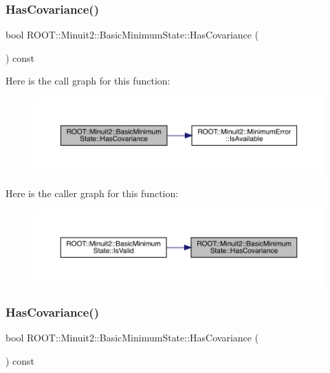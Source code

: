 \subsubsection{\texorpdfstring{HasCovariance()}{HasCovariance()}\hspace{0.1cm}{\footnotesize\ttfamily [2/3]}}
{\footnotesize\ttfamily bool R\+O\+O\+T\+::\+Minuit2\+::\+Basic\+Minimum\+State\+::\+Has\+Covariance (\begin{DoxyParamCaption}{ }\end{DoxyParamCaption}) const\hspace{0.3cm}{\ttfamily [inline]}}

Here is the call graph for this function\+:
\nopagebreak
\begin{figure}[H]
\begin{center}
\leavevmode
\includegraphics[width=350pt]{d0/db1/classROOT_1_1Minuit2_1_1BasicMinimumState_a9d43155058c576759d062561d77b3e1d_cgraph}
\end{center}
\end{figure}
Here is the caller graph for this function\+:
\nopagebreak
\begin{figure}[H]
\begin{center}
\leavevmode
\includegraphics[width=350pt]{d0/db1/classROOT_1_1Minuit2_1_1BasicMinimumState_a9d43155058c576759d062561d77b3e1d_icgraph}
\end{center}
\end{figure}
\mbox{\label{classROOT_1_1Minuit2_1_1BasicMinimumState_a9d43155058c576759d062561d77b3e1d}} 
\subsubsection{\texorpdfstring{HasCovariance()}{HasCovariance()}\hspace{0.1cm}{\footnotesize\ttfamily [3/3]}}
{\footnotesize\ttfamily bool R\+O\+O\+T\+::\+Minuit2\+::\+Basic\+Minimum\+State\+::\+Has\+Covariance (\begin{DoxyParamCaption}{ }\end{DoxyParamCaption}) const\hspace{0.3cm}{\ttfamily [inline]}}

